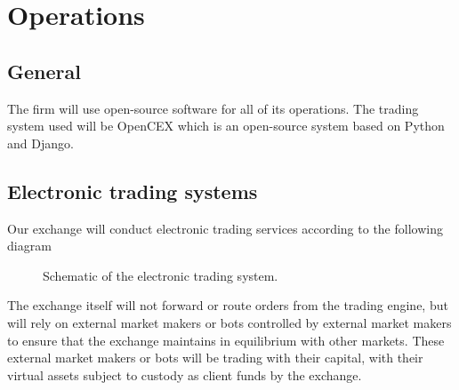 \chapter{Operations}

\section{General}
The firm will use open-source software for all of its operations.  The
trading system used will be OpenCEX which is an open-source system
based on Python and Django.

\section{Electronic trading systems}
Our exchange will conduct electronic trading services according to the
following diagram
\begin{figure}
  \begin{adjustbox}{center}
\end{adjustbox}
\caption{Schematic of the electronic trading system.}
\end{figure}

The exchange itself will not forward or route orders from the trading
engine, but will rely on external market makers or bots controlled by
external market makers to ensure that the exchange maintains in
equilibrium with other markets.  These external market makers or bots
will be trading with their capital, with their virtual assets
subject to custody as client funds by the exchange.

